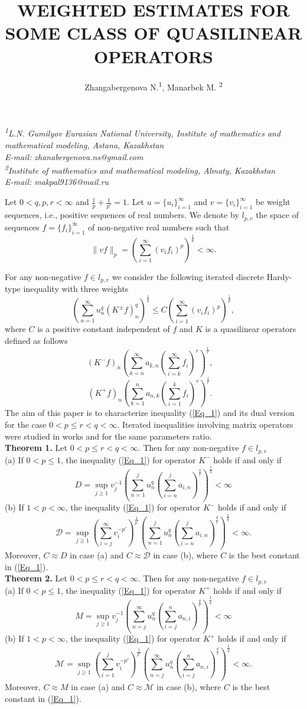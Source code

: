 \documentclass[12pt]{article}
\title{WEIGHTED ESTIMATES FOR SOME CLASS OF QUASILINEAR OPERATORS}
\author{Zhangabergenova N.\textsuperscript{1}, Manarbek M. \textsuperscript{2}}
\date{}
\makeatletter
\renewcommand{\maketitle}{%
    \begin{center}
        \Large\@title
        
        \vspace{0.4cm}
        \large\@author
        
        \vspace{0.5cm}
        \normalsize\textit{\textsuperscript{1}L.N. Gumilyov Eurasian National University, Institute of mathematics
and mathematical modeling, Astana, Kazakhstan\\
          E-mail: zhanabergenova.ns@gmail.com\\
          \textsuperscript{2}Institute of mathematics and mathematical modeling, Almaty, Kazakhstan\\
          E-mail: makpal9136@mail.ru\\}
    \end{center}
}
\makeatother
\begin{document}
\maketitle
Let  $0<q, p, r < \infty$ and $\frac{1}{p}+\frac{1}{p'}=1$. Let $u=\{u_{i}\}_{i=1}^{\infty}$ and $v=\{v_{i}\}_{i=1}^{\infty}$  be weight sequences, i.e., positive sequences of real numbers. We denote by  $l_{p,v}$ the space of sequences  $f=\{f_{i}\}_{i=1}^{\infty}$ of non-negative real numbers such that
$$\|vf\|_{p}=\left(\sum_{i=1}^\infty (v_i f_i)^p \right)^\frac{1}{p} <\infty. $$

For any non-negative $f \in l_{p,v}$ we consider the following iterated discrete Hardy-type inequality with three
weights
\begin{equation}
\label{Eq_1}
	\left(\sum\limits_{n=1}^\infty u_n^q (K^{\pm}f)_n^{q} \right)^\frac{1}{q} \leq C \left(\sum\limits_{i=1}^\infty (v_i f_i)^p \right)^\frac{1}{p},
\end{equation}
where $C$  is a positive constant independent of $f$ and $K$ is a quasilinear operators defined as follows
$$(K^{-}f)_n\left(\sum\limits_{k=n}^\infty   a_{k,n} \left(\sum\limits_{i=k}^\infty f_i \right)^r \right)^\frac{1}{r}, \;\;\;$$
$$(K^{+}f)_n\left(\sum\limits_{k=1}^n   a_{n,k} \left(\sum\limits_{i=1}^k f_i \right)^r \right)^\frac{1}{r}. \;\;\;$$
 The aim of this paper is to characterize inequality (\ref{Eq_1}) and its dual version
 for the case $0<p\leq r< q<\infty$. Iterated inequalities involving matrix operators were studied in works \cite{1} and \cite{2} for the same parameters ratio. \\
\textbf{Theorem 1.} Let $0<p\leq r< q<\infty$. Then for any non-negative $f \in l_{p,v}$\\
	(a) If $0<p\leq 1$, the inequality (\ref{Eq_1}) for operator $K^{-}$ holds if and only if 
$$D =\sup\limits_{j\geq1} v_j^{-1} \left(\sum\limits_{n=1}^j u_n^q \left(\sum\limits_{i=n}^j a_{i,n}\right)^\frac{q}{r} \right)^\frac{1}{q}<\infty$$	
(b) If $1<p<\infty$, the inequality (\ref{Eq_1}) for operator $K^{-}$ holds if and only if 	
$$\mathcal{D} =\sup\limits_{j\geq1} \left(\sum\limits_{i=j}^\infty v_i^{-p'} \right)^\frac{1}{p'} \left(\sum\limits_{n=1}^j u_n^q \left(\sum\limits_{i=n}^j a_{i,n}\right)^\frac{q}{r} \right)^\frac{1}{q}<\infty.
$$
Moreover, $C\approx D$ in case (a) and $C\approx \mathcal{D}$ in case (b), where  $C$  is the best constant in (\ref{Eq_1}).\\
\textbf{Theorem 2.} Let $0<p\leq r< q<\infty$. Then for any non-negative $f \in l_{p,v}$\\
	(a) If $0<p\leq 1$, the inequality (\ref{Eq_1}) for operator $K^{+}$ holds if and only if 
$$M =\sup\limits_{j\geq1} v_j^{-1} \left(\sum\limits_{n=j}^\infty u_n^q \left(\sum\limits_{i=j}^n a_{n,i}\right)^\frac{q}{r} \right)^\frac{1}{q}<\infty$$	
(b) If $1<p<\infty$, the inequality (\ref{Eq_1}) for operator $K^{+}$ holds if and only if 	
$$\mathcal{M} =\sup\limits_{j\geq1} \left(\sum\limits_{i=1}^j v_i^{-p'} \right)^\frac{1}{p'} \left(\sum\limits_{n=j}^\infty u_n^q \left(\sum\limits_{i=j}^n a_{n,i}\right)^\frac{q}{r} \right)^\frac{1}{q}<\infty.
$$
Moreover, $C\approx M$ in case (a) and $C\approx \mathcal{M}$ in case (b), where  $C$  is the best constant in (\ref{Eq_1}).\\
\end{document}
